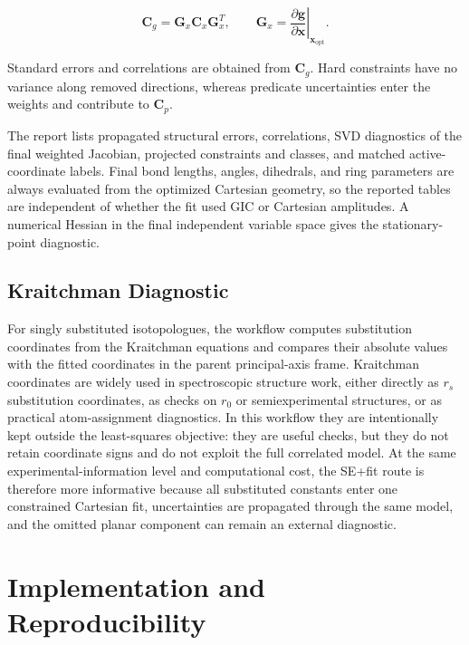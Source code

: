 \documentclass[aip,jcp,reprint,longbibliography,floatfix]{revtex4-2}
\begin{document}
\begin{equation}
\mathbf{C}_{g}
=
\mathbf{G}_{x}
\mathbf{C}_{x}
\mathbf{G}_{x}^{T},
\qquad
\mathbf{G}_{x}
=
\left.
\frac{\partial\mathbf{g}}
{\partial\mathbf{x}}
\right|_{\mathbf{x}_{\mathrm{opt}}}.
\end{equation}

Standard errors and correlations are obtained from $\mathbf{C}_{g}$. Hard
constraints have no variance along removed directions, whereas predicate
uncertainties enter the weights and contribute to $\mathbf{C}_{p}$.

The report lists propagated structural errors, correlations, SVD diagnostics of
the final weighted Jacobian, projected constraints and classes, and matched
active-coordinate labels. Final bond lengths, angles, dihedrals, and ring
parameters are always evaluated from the optimized Cartesian geometry, so the
reported tables are independent of whether the fit used GIC or Cartesian
amplitudes. A numerical Hessian in the final independent variable space gives
the stationary-point diagnostic.


\subsection{Kraitchman Diagnostic}

For singly substituted isotopologues, the workflow computes substitution
coordinates from the Kraitchman equations\cite{Kraitchman1953} and compares
their absolute values with the fitted coordinates in the parent principal-axis
frame. Kraitchman coordinates are widely used in spectroscopic structure work,
either directly as $r_s$ substitution coordinates, as checks on $r_0$ or
semiexperimental structures, or as practical atom-assignment diagnostics. In
this workflow they are intentionally kept outside the least-squares objective:
they are useful checks, but they do not retain coordinate signs and do not
exploit the full correlated model. At the same experimental-information level
and computational cost, the SE+fit route is therefore more informative because
all substituted constants enter one constrained Cartesian fit, uncertainties
are propagated through the same model, and the omitted planar component can
remain an external diagnostic.


\section{Implementation and Reproducibility}
\end{document}
